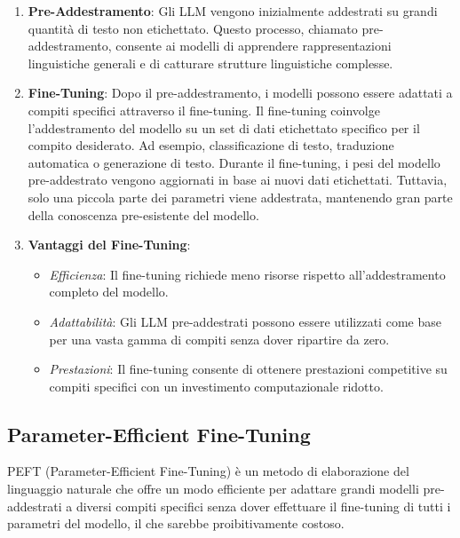  \begin{enumerate}[label=\alph*.]
    \item  \textbf{Pre-Addestramento}: Gli LLM vengono inizialmente addestrati su grandi quantità di testo non etichettato. Questo processo, chiamato pre-addestramento, consente ai modelli di apprendere rappresentazioni linguistiche generali e di catturare strutture linguistiche complesse.
    
    
    \item  \textbf{Fine-Tuning}: Dopo il pre-addestramento, i modelli possono essere adattati a compiti specifici attraverso il fine-tuning.
        Il fine-tuning coinvolge l’addestramento del modello su un set di dati etichettato specifico per il compito desiderato. Ad esempio, classificazione di testo, traduzione automatica o generazione di testo.
        Durante il fine-tuning, i pesi del modello pre-addestrato vengono aggiornati in base ai nuovi dati etichettati. Tuttavia, solo una piccola parte dei parametri viene addestrata, mantenendo gran parte della conoscenza pre-esistente del modello.

    
    \item  \textbf{Vantaggi del Fine-Tuning}:
        \begin{itemize}
         \item \textit{Efficienza}: Il fine-tuning richiede meno risorse rispetto all’addestramento completo del modello.
         \item \textit{Adattabilità}: Gli LLM pre-addestrati possono essere utilizzati come base per una vasta gamma di compiti senza dover ripartire da zero.
         \item \textit{Prestazioni}: Il fine-tuning consente di ottenere prestazioni competitive su compiti specifici con un investimento computazionale ridotto.
        \end{itemize}  

\end{enumerate}   

    


\subsection{Parameter-Efficient Fine-Tuning}\label{subsec:peft}
PEFT (Parameter-Efficient Fine-Tuning) è un metodo di elaborazione del linguaggio naturale \cite{peft} che offre un modo efficiente per adattare grandi modelli pre-addestrati a diversi compiti specifici senza dover effettuare il fine-tuning di tutti i parametri del modello, il che sarebbe proibitivamente costoso. 

